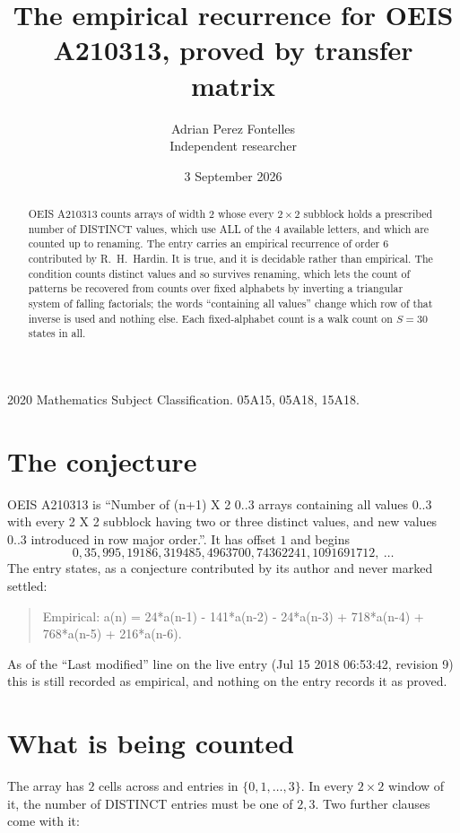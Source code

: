 \documentclass[11pt,a4paper]{article}
\title{The empirical recurrence for OEIS A210313, proved by transfer matrix}
\author{Adrian Perez Fontelles\\ \small Independent researcher}
\date{3 September 2026}
\theoremstyle{plain}
\theoremstyle{definition}
\begin{document}
\maketitle

\begin{abstract}
OEIS A210313 counts arrays of width $2$ whose every $2\times2$ subblock holds a
prescribed number of DISTINCT values, which use ALL of the $4$ available letters, and which
are counted up to renaming. The entry carries an empirical recurrence of order $6$
contributed by R.~H.~Hardin. It is true, and it is decidable rather than empirical. The
condition counts distinct values and so survives renaming, which lets the count of patterns be
recovered from counts over fixed alphabets by inverting a triangular system of falling
factorials; the words ``containing all values'' change which row of that inverse is used and
nothing else. Each fixed-alphabet count is a walk count on $S=30$ states in all.
\end{abstract}

\noindent\small 2020 Mathematics Subject Classification. 05A15, 05A18, 15A18.\normalsize

\section{The conjecture}

OEIS A210313 is ``Number of (n+1) X 2 0..3 arrays containing all values 0..3 with every 2 X 2 subblock having two or three distinct values, and new values 0..3 introduced in row major order.''. It has offset $1$ and begins
\[
0, 35, 995, 19186, 319485, 4963700, 74362241, 1091691712,\ \dots
\]
The entry states, as a conjecture contributed by its author and never marked settled:
\begin{quote}
Empirical: a(n) = 24*a(n-1) - 141*a(n-2) - 24*a(n-3) + 718*a(n-4) + 768*a(n-5) + 216*a(n-6).
\end{quote}
As of the ``Last modified'' line on the live entry (Jul 15 2018 06:53:42, revision 9) this is still
recorded as empirical, and nothing on the entry records it as proved.

\section{What is being counted}

The array has $2$ cells across and entries in $\{0,1,\dots,3\}$. In every
$2\times2$ window of it, the number of DISTINCT entries must be one of $2, 3$. Two
further clauses come with it:
\end{document}
